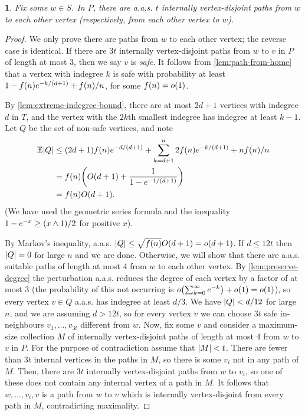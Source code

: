 \documentclass[11pt,english]{article}
\theoremstyle{plain}
\theoremstyle{definition}
\theoremstyle{definition}
\theoremstyle{plain}
\theoremstyle{plain}
\theoremstyle{plain}
\newtheorem{lem}[thm]{\protect\lemmaname}
\theoremstyle{plain}
\theoremstyle{remark}
\theoremstyle{remark}
\let\originalleft\left
\let\originalright\right
\renewcommand{\left}{\mathopen{}\mathclose\bgroup\originalleft}
\renewcommand{\right}{\aftergroup\egroup\originalright}
\providecommand{\lemmaname}{Lemma}
\begin{document}
\begin{lem}
\label{lem:lots-of-paths}Fix some $w\in S$. In $P$, there are a.a.s.
$t$ internally vertex-disjoint paths from $w$ to each other vertex
(respectively, from each other vertex to $w$).\end{lem}
\begin{proof}
We only prove there are paths from $w$ to each other vertex; the
reverse case is identical. If there are $3t$ internally vertex-disjoint
paths from $w$ to $v$ in $P$ of length at most 3, then we say $v$
is \emph{safe}. It follows from \ref{lem:path-from-home} that a vertex
with indegree $k$ is safe with probability at least $1-f\left(n\right)e^{-k/\left(d+1\right)}+f\left(n\right)/n$,
for some $f\left(n\right)=o\left(1\right)$.

By \ref{lem:extreme-indegree-bound}, there are at most $2d+1$ vertices
with indegree $d$ in $T$, and the vertex with the $2k$th smallest
indegree has indegree at least $k-1$. Let $Q$ be the set of non-safe
vertices, and note 
\begin{align*}
\E\left|Q\right| & \le\left(2d+1\right)f\left(n\right)e^{-d/\left(d+1\right)}+\sum_{k=d+1}^{n}2f\left(n\right)e^{-k/\left(d+1\right)}+nf\left(n\right)/n\\
 & =f\left(n\right)\left(O\left(d+1\right)+\frac{1}{1-e^{-1/\left(d+1\right)}}\right)\\
 & =f\left(n\right)O\left(d+1\right).
\end{align*}
(We have used the geometric series formula and the inequality $1-e^{-x}\ge\left(x\land1\right)/2$
for positive $x$).

By Markov's inequality, a.a.s. $\left|Q\right|\le\sqrt{f\left(n\right)}O\left(d+1\right)=o\left(d+1\right)$.
If $d\le12t$ then $\left|Q\right|=0$ for large $n$ and we are done. Otherwise, we will show that there are a.a.s. suitable paths of length at most 4 from $w$ to each other vertex. By \ref{lem:preserve-degree} the perturbation a.a.s. reduces the degree of each vertex by a factor of at most 3 (the probability of this not occurring is $o\left(\sum_{k=0}^\infty e^{-k}\right)+o\left(1\right)=o\left(1\right)$), so every vertex $v\in Q$ a.a.s. has indegree at least $d/3$. We have $\left|Q\right|<d/12$ for large $n$, and we are assuming $d>12t$, so for every vertex $v$ we can choose $3t$ safe in-neighbours $v_{1},\dots,v_{3t}$ different from $w$. Now, fix some $v$ and consider a maximum-size collection $M$ of internally vertex-disjoint paths of length at most 4 from $w$ to $v$ in $P$. For the purpose of contradiction assume that $\left|M\right|<t$. There are fewer than $3t$ internal vertices in the paths in $M$, so there is some $v_{i}$ not in any path of $M$. Then, there are $3t$ internally vertex-disjoint paths from $w$ to $v_{i}$, so one of these does not contain any
internal vertex of a path in $M$. It follows that $w,\dots,v_{i},v$ is a path from $w$ to $v$ which is
internally vertex-disjoint from every path in $M$, contradicting maximality.
\end{proof}
\end{document}
